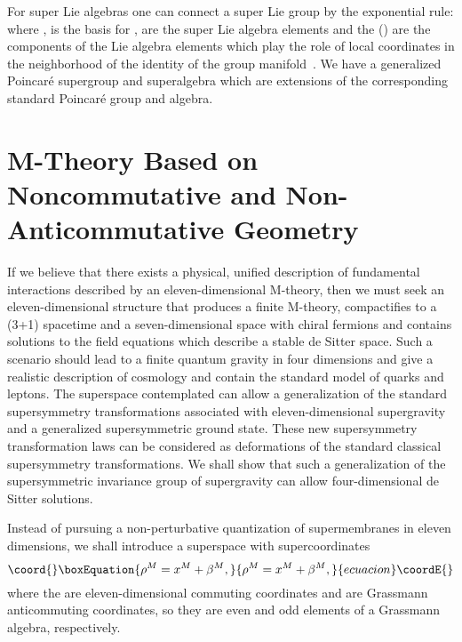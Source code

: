 \documentclass[a4paper,12pt]{article}
\begin{document}
For super Lie algebras \coordHE{} one can connect a super Lie
group \coordHE{} by the exponential rule: \coordHE{} where \coordHE{}, \coordHE{} is
the basis for \coordHE{}, \coordHE{} are the super Lie algebra
elements and the \coordHE{} (\coordHE{}) are
the components of the Lie algebra elements which play the role of
local coordinates in the neighborhood of the identity of the
group manifold~\cite{Berezin}. We have a generalized Poincar\'e
supergroup and superalgebra which are extensions of the
corresponding standard Poincar\'e group and algebra.

\section{\bf M-Theory Based on Noncommutative and Non-Anticommutative Geometry}

If we believe that there exists a physical, unified description of fundamental
interactions described by an eleven-dimensional M-theory, then we must seek
an eleven-dimensional structure that produces a finite M-theory,
compactifies to a (3+1) spacetime and a seven-dimensional space with chiral
fermions and contains solutions to the field equations which describe a
stable de Sitter space. Such a scenario should lead to a finite quantum
gravity in four dimensions and give a realistic description of cosmology
and contain the standard model of quarks and leptons. The superspace
contemplated can allow a generalization of the standard supersymmetry
transformations associated with eleven-dimensional supergravity and a
generalized supersymmetric ground state. These new supersymmetry
transformation laws can be considered as deformations of the standard
classical supersymmetry transformations. We shall show that such a
generalization of the supersymmetric invariance group of supergravity can
allow four-dimensional de Sitter solutions.

Instead of pursuing a
non-perturbative quantization of supermembranes in eleven dimensions, we
shall introduce a superspace with
supercoordinates~\cite{Moffat2,Moffat3,Moffat4,Moffat5}
\begin{equation}\coord{}\boxEquation{
\label{coordinates}
\rho^M=x^M+\beta^M,
}{
\rho^M=x^M+\beta^M,
}{ecuacion}\coordE{}\end{equation}
where the \coordHE{} are eleven-dimensional commuting coordinates
and \coordHE{} are Grassmann anticommuting coordinates, so they
are even and odd elements of a Grassmann algebra, respectively.
\end{document}
